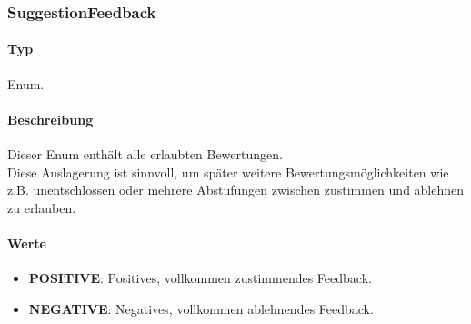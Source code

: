\subsubsection{SuggestionFeedback}
\paragraph*{Typ}
Enum.
\paragraph*{Beschreibung}
Dieser Enum enthält alle erlaubten Bewertungen.\\
Diese Auslagerung ist sinnvoll, um später weitere Bewertungsmöglichkeiten wie z.B. unentschlossen oder 
mehrere Abstufungen zwischen zustimmen und ablehnen zu erlauben.

\paragraph*{Werte}
\begin{itemize}
    \item \textbf{POSITIVE}: Positives, vollkommen zustimmendes Feedback.
    \item \textbf{NEGATIVE}: Negatives, vollkommen ablehnendes Feedback.
\end{itemize}
